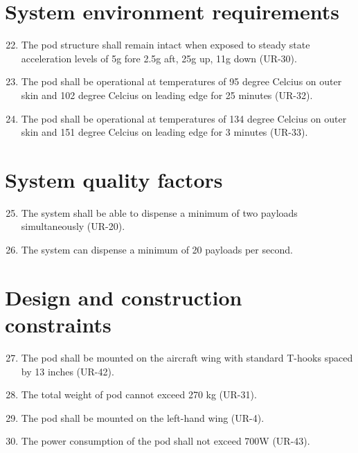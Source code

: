 \documentclass[Main]{subfiles}
\begin{document}
\section{System environment requirements}

\begin{enumerate}[{SR}-1]
\setcounter{enumi}{21}
\item The pod structure shall remain intact when exposed to steady state acceleration levels of 5g fore 2.5g aft, 25g up, 11g down (UR-30).\label{SR-22}

\item The pod shall be operational at temperatures of 95 degree Celcius on outer skin and 102 degree Celcius on leading edge for 25 minutes (UR-32).\label{SR-23}

\item The pod shall be operational at temperatures of 134 degree Celcius on outer skin and 151 degree Celcius on leading edge for 3 minutes (UR-33).\label{SR-24}

\end{enumerate}



\section{System quality factors}

\begin{enumerate}[{SR}-1]
\setcounter{enumi}{24}
\item The system shall be able to dispense a minimum of two payloads simultaneously (UR-20).\label{SR-25}

\item The system can dispense a minimum of 20 payloads per second.\label{SR-26}
\end{enumerate}

\section{Design and construction constraints}

\begin{enumerate}[{SR}-1]
\setcounter{enumi}{26}
\item The pod shall be mounted on the aircraft wing with standard T-hooks spaced by 13 inches (UR-42).\label{SR-27}

\item The total weight of pod cannot exceed 270 kg (UR-31).\label{SR-28}

\item The pod shall be mounted on the left-hand wing (UR-4).\label{SR-29}

\item The power consumption of the pod shall not exceed 700W (UR-43).\label{SR-30}
\end{enumerate}
\end{document}
